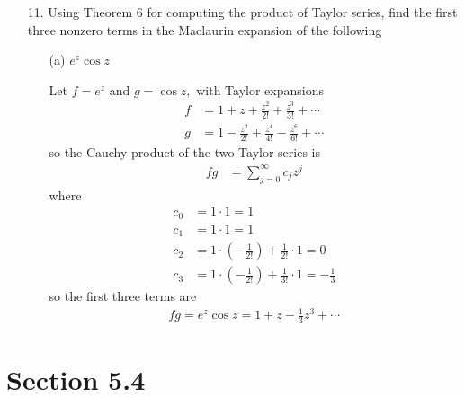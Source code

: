 \documentclass{article}
\begin{document}
\begin{itemize}
	\item[11.] Using Theorem 6 for computing the product of Taylor series, find the first three nonzero terms in the Maclaurin expansion of the following
		\begin{itemize}
			\item[(a)] $e^{z}\cos z$
				\begin{soln}
					Let $f=e^z$ and $g=\cos z,$ with Taylor expansions
					\begin{align*}
						f &= 1 + z + \frac{z^2}{2!} + \frac{z^3}{3!} + \cdots \\
						g &= 1 - \frac{z^2}{2!} + \frac{z^4}{4!} - \frac{z^6}{6!} + \cdots
					\end{align*}
					so the Cauchy product of the two Taylor series is
					\begin{align*}
						fg &= \sum_{j=0}^{\infty}c_j z^j
					\end{align*}
					where
					\begin{align*}
						c_0 &= 1\cdot 1 = 1 \\
						c_1 &= 1\cdot 1 = 1 \\
						c_2 &= 1\cdot \left( -\frac{1}{2!} \right) + \frac{1}{2!}\cdot 1 = 0 \\
						c_3 &= 1\cdot \left( -\frac{1}{2!} \right) + \frac{1}{3!}\cdot 1 = -\frac{1}{3}
					\end{align*}
					so the first three terms are
					\begin{align*}
						fg =e^z\cos z = 1 + z - \frac{1}{3}z^3 + \cdots
					\end{align*}
				\end{soln}
				
		\end{itemize}

\end{itemize}

\section*{Section 5.4}
\end{document}
